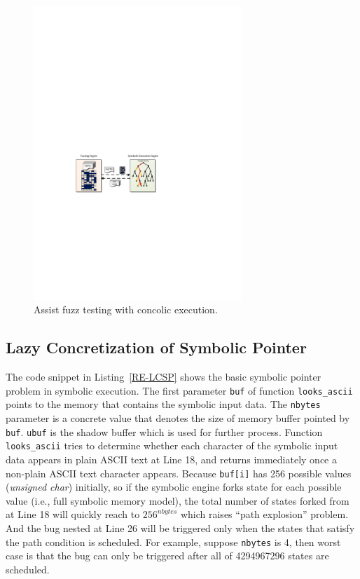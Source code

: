 \begin{figure}
\centering
\includegraphics[width=0.7\textwidth]{figures/s2e-assist.pdf} 
\caption{Assist fuzz testing with concolic execution.}\label{s2e-assist}
\end{figure}

\subsection{Lazy Concretization of Symbolic Pointer}
The code snippet in Listing~\ref{RE-LCSP} shows the basic symbolic pointer problem in symbolic execution. 
The first parameter \texttt{buf} of function \texttt{looks\_ascii} points to the memory that contains the symbolic input data. The \texttt{nbytes} parameter is a concrete value that denotes the size of memory buffer pointed by \texttt{buf}. \texttt{ubuf} is the shadow buffer which is used for further process. 
Function \texttt{looks\_ascii} tries to determine whether each character of the symbolic input data appears in plain ASCII text at Line 18, and returns immediately once a non-plain ASCII text character appears. 
Because \texttt{buf[i]} has 256 possible values (\textit{unsigned char}) initially, so if the symbolic engine forks state for each possible value (i.e., full symbolic memory model), the total number of states forked from at Line 18 will quickly reach to $256^{nbytes}$ which raises ``path explosion'' problem. And the bug nested at Line 26 will be triggered only when the states that satisfy the path condition is scheduled. For example, suppose \texttt{nbytes} is 4, then worst case is that the bug can only be triggered after all of 4294967296 states are scheduled.

